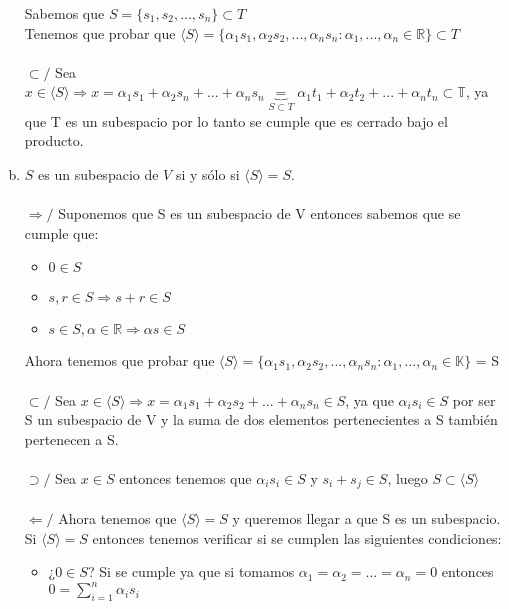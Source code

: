 \documentclass{article}
\begin{document}
\begin{enumerate}[a.]
		Sabemos que $S = \lbrace s_1,s_2,...,s_n\rbrace \subset T$ \\
		Tenemos que probar que $\langle S \rangle = \lbrace \alpha_1 s_1,\alpha_2 s_2,...,\alpha_n s_n : \alpha_1,...,\alpha_n \in
		\mathbb{R} \rbrace \subset T$ \\ \\
		$\subset/ $ Sea $x \in \langle S\rangle \Rightarrow x = \alpha_1 s_1 + \alpha_2 s_n + ... + \alpha_n s_n \underbrace{=}_{S \subset T} 
		\alpha_1 t_1 + \alpha_2 t_2 + ... + \alpha_n t_n \subset \mathbb{T}$, ya que T es un subespacio por lo tanto se cumple que es cerrado bajo
		el producto.
\item
	$S$ es un subespacio de $V$ si y sólo si $\langle S \rangle = S$.  \\ \\
	$\Rightarrow/$ Suponemos que S es un subespacio de V entonces sabemos que se cumple que:
	\begin{itemize}
		\item
			$0 \in S$
		\item
			$s,r \in S \Rightarrow s+r \in S$
		\item
			$s \in S, \alpha \in \mathbb{R} \Rightarrow \alpha s \in S$
	\end{itemize}
	Ahora tenemos que probar que 
	$\langle S \rangle = \lbrace \alpha_1 s_1,\alpha_2 s_2,...,\alpha_n s_n : \alpha_1,...,\alpha_n \in \mathbb{K}\rbrace$ = S \\ \\
	$\subset /$ 
		Sea $x \in \langle S\rangle \Rightarrow x = \alpha_1 s_1 + \alpha_2 s_2 + ... + \alpha_n s_n \in S$, ya que
		$\alpha_i s_i \in S$ por ser S un subespacio de V y la suma de dos elementos pertenecientes a S también pertenecen a S. \\ \\
	$\supset /$
		Sea $x \in S$ entonces tenemos que $\alpha_i s_i \in S$ y $s_i+s_j \in S$, luego $S \subset \langle S\rangle$  \\ \\
	$\Leftarrow /$ Ahora tenemos que $\langle S \rangle = S$ y queremos llegar a que S es un subespacio. \\
	Si $\langle S \rangle = S$ entonces tenemos verificar si se cumplen las siguientes condiciones:
	\begin{itemize}
		\item
			¿$0 \in S$? Si se cumple ya que si tomamos $\alpha_1 = \alpha_2 = ... = \alpha_n = 0$ entonces
			$0 = \displaystyle \sum_{i=1}^{n}{\alpha_i s_i}$ \\

\end{itemize}
\end{enumerate}
\end{document}
